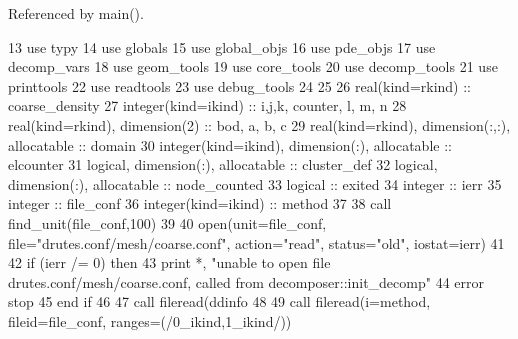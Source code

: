 Referenced by main().


\begin{DoxyCode}
13       \textcolor{keywordtype}{use }typy
14       \textcolor{keywordtype}{use }globals
15       \textcolor{keywordtype}{use }global_objs
16       \textcolor{keywordtype}{use }pde_objs
17       \textcolor{keywordtype}{use }decomp_vars
18       \textcolor{keywordtype}{use }geom_tools
19       \textcolor{keywordtype}{use }core_tools
20       \textcolor{keywordtype}{use }decomp_tools
21       \textcolor{keywordtype}{use }printtools
22       \textcolor{keywordtype}{use }readtools
23       \textcolor{keywordtype}{use }debug_tools
24     
25 
26       \textcolor{keywordtype}{real(kind=rkind)} :: coarse\_density
27       \textcolor{keywordtype}{integer(kind=ikind)} :: i,j,k, counter, l, m, n
28       \textcolor{keywordtype}{real(kind=rkind)}, \textcolor{keywordtype}{dimension(2)} :: bod, a, b, c
29       \textcolor{keywordtype}{real(kind=rkind)}, \textcolor{keywordtype}{dimension(:,:)}, \textcolor{keywordtype}{allocatable} :: domain
30       \textcolor{keywordtype}{integer(kind=ikind)}, \textcolor{keywordtype}{dimension(:)}, \textcolor{keywordtype}{allocatable} :: elcounter
31       \textcolor{keywordtype}{logical}, \textcolor{keywordtype}{dimension(:)}, \textcolor{keywordtype}{allocatable} :: cluster\_def
32       \textcolor{keywordtype}{logical}, \textcolor{keywordtype}{dimension(:)}, \textcolor{keywordtype}{allocatable} :: node\_counted
33       \textcolor{keywordtype}{logical} :: exited
34       \textcolor{keywordtype}{integer} :: ierr
35       \textcolor{keywordtype}{integer} :: file\_conf
36       \textcolor{keywordtype}{integer(kind=ikind)} :: method
37 
38       \textcolor{keyword}{call }find_unit(file\_conf,100)
39 
40       \textcolor{keyword}{open}(unit=file\_conf, file=\textcolor{stringliteral}{"drutes.conf/mesh/coarse.conf"}, action=\textcolor{stringliteral}{"read"}\textcolor{comment}{, status=}\textcolor{stringliteral}{"old"}\textcolor{comment}{, iostat=ierr)}
41 \textcolor{comment}{}
42 \textcolor{comment}{      }\textcolor{keywordflow}{if} (ierr /= 0) \textcolor{keywordflow}{then}
43         print *, \textcolor{stringliteral}{"unable to open file drutes.conf/mesh/coarse.conf, called from decomposer::init\_decomp"}
44         error stop
45 \textcolor{keywordflow}{      end if}
46       
47       \textcolor{keyword}{call }fileread(ddinfo%
48 \textcolor{comment}{}
49 \textcolor{comment}{      }\textcolor{keyword}{call }fileread(i=method, fileid=file\_conf, ranges=(/0\_ikind,1\_ikind\textcolor{comment}{/))}

\end{DoxyCode}
